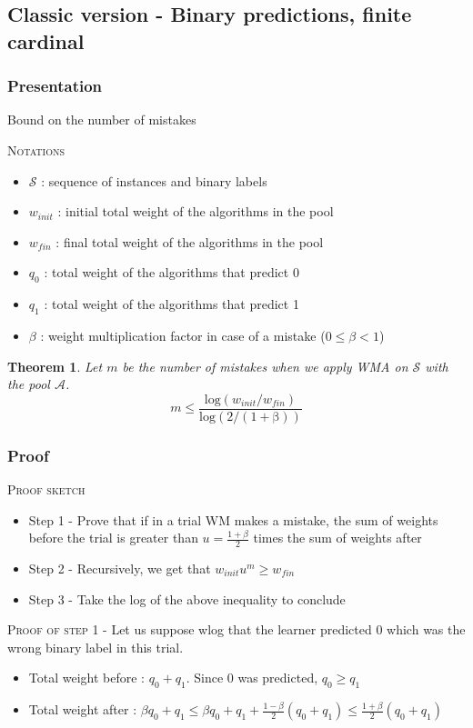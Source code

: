\documentclass{beamer}
\newtheorem{Th}{Theorem}
\begin{document}
		\subsection{Classic version - Binary predictions, finite cardinal}
			\subsubsection*{Presentation}
\begin{frame}{Bound on the number of mistakes}

\textsc{Notations} 
\begin{itemize}
\item $\mathcal{S}$ : sequence of instances and binary labels
\item $w_{init}$ : initial total weight of the algorithms in the pool
\item $w_{fin}$ : final total weight of the algorithms in the pool
\item $q_0$ : total weight of the algorithms that predict 0
\item $q_1$ : total weight of the algorithms that predict 1
\item $\beta$ : weight multiplication factor in case of a mistake ($0\leq\beta<1$) 
\end{itemize}

\begin{Th}
Let $m$ be the number of mistakes when we apply WMA on $\mathcal{S}$ with the pool $\mathcal{A}$.
\[m \leq \frac{\mathrm{log}(w_{init}/w_{fin})}{\mathrm{log(2/(1+\beta))}}\]
\end{Th}

\end{frame}
			
			\subsubsection*{Proof}
			
\begin{frame}
\textsc{Proof sketch}  
\begin{itemize}
\item Step 1 - Prove that if in a trial WM makes a mistake, the sum of weights before the trial is greater than $u=\frac{1+\beta}{2}$ times the sum of weights after
\item Step 2 - Recursively, we get that $w_{init}u^m \geq w_{fin}$
\item Step 3 - Take the log of the above inequality to conclude \newline
\end{itemize}

\textsc{Proof of step 1} - Let us suppose wlog that the learner predicted 0 which was the wrong binary label in this trial.
\begin{itemize}
\item Total weight before : $q_0 + q_1$. Since 0 was predicted, $q_0 \geq q_1$
\item Total weight after : $\beta q_0 + q_1 \leq \beta q_0 + q_1 + \frac{1-\beta}{2}(q_0 + q_1) \leq \frac{1+\beta}{2}(q_0 + q_1)$
\end{itemize}
\end{frame}
\end{document}
